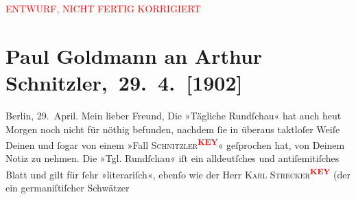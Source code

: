 
\begin{center}
            \textcolor{red}{ENTWURF, NICHT FERTIG KORRIGIERT}
                      \end{center}
            
         \renewcommand{\erwaehnteInstitutionen}{Institutionen: Berliner Tageblatt, Tägliche Rundschau}
         \renewcommand{\erwaehnteOrte}{Orte: Berlin, Deutschland, Wien, Österreich}
         \renewcommand{\erwaehnteWerke}{Werke: Tägliche Rundschau}
               \section[ Paul Goldmann an Arthur Schnitzler, 29. 4. {[}1902{]}]{ Paul Goldmann an Arthur Schnitzler, 29. 4. {[}1902{]}}\nopagebreak{}\rehead{ }\begin{ledgroupsized}[t]{13cm}\normalsize\beginnumbering \toendnotes[C]{\smallbreak\pagebreak[2]} 
\toendnotes[C]{\smallbreak}\pstart
           \centering{}{\pb}Berlin, 29. April.\pend
           \pstart{}Mein lieber Freund,\pend\pstart
           Die »Tägliche Rundſchau« hat auch heut{ }Morgen noch nicht für nöthig befunden, nachdem ſie in überaus
                    taktloſer Weiſe Deinen \label{K_L03205-1v}\label{K_L03205-1h} und ſogar von einem »Fall \textsc{Schnitzler}\textcolor{red}{\textsuperscript{\textbf{KEY}}}« geſprochen hat, von Deinem \label{K_L03205-2v}\label{K_L03205-2h} Notiz zu nehmen.
                    Die »Tgl. Rundſchau« iſt ein alldeutſches
                    und antiſemitiſches Blatt und gilt für
                    ſehr »literariſch«, ebenſo wie der Herr \textsc{Karl Strecker\textcolor{red}{\textsuperscript{\textbf{KEY}}}} (der ein  germaniſtiſcher Schwätzer

\end{ledgroupsized}
